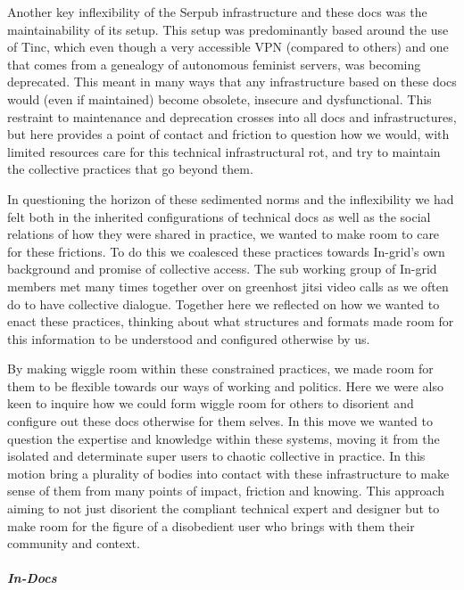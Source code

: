 Another key inflexibility of the Serpub infrastructure and these docs
was the maintainability of its setup. This setup was predominantly based
around the use of Tinc, which even though a very accessible VPN
(compared to others) and one that comes from a genealogy of autonomous
feminist servers, was becoming deprecated. This meant in many ways that
any infrastructure based on these docs would (even if maintained) become
obsolete, insecure and dysfunctional. This restraint to maintenance and
deprecation crosses into all docs and infrastructures, but here provides
a point of contact and friction to question how we would, with limited
resources care for this technical infrastructural rot, and try to
maintain the collective practices that go beyond them.

In questioning the horizon of these sedimented norms and the
inflexibility we had felt both in the inherited configurations of
technical docs as well as the social relations of how they were shared
in practice, we wanted to make room to care for these frictions. To do
this we coalesced these practices towards In-grid's own background and
promise of collective access. The sub working group of In-grid members
met many times together over on greenhost jitsi video calls as we often
do to have collective dialogue. Together here we reflected on how we
wanted to enact these practices, thinking about what structures and
formats made room for this information to be understood and configured
otherwise by us.

By making wiggle room within these constrained practices, we made room
for them to be flexible towards our ways of working and politics. Here
we were also keen to inquire how we could form wiggle room for others to
disorient and configure out these docs otherwise for them selves. In
this move we wanted to question the expertise and knowledge within these
systems, moving it from the isolated and determinate super users to
chaotic collective in practice. In this motion bring a plurality of
bodies into contact with these infrastructure to make sense of them from
many points of impact, friction and knowing. This approach aiming to not
just disorient the compliant technical expert and designer but to make
room for the figure of a disobedient user who brings with them their
community and context.

\hypertarget{in-docs}{%
\subparagraph[In-Docs]{\texorpdfstring{\protect\hypertarget{anchor}{}{}In-Docs}{In-Docs}}\label{in-docs}}

